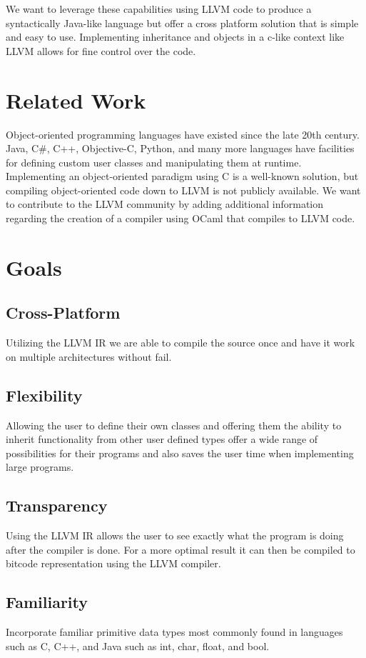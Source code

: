 \begin{homeworkProblem}
	We want to leverage these capabilities using LLVM code to produce a syntactically Java-like language but offer a cross platform solution that is simple and easy to use. Implementing inheritance and objects in a c-like context like LLVM allows for fine control over the code. \\
	
	\section{Related Work}
	Object-oriented programming languages have existed since the late 20th century. Java, C\#, C++, Objective-C, Python, and many more languages have facilities for defining custom user classes and manipulating them at runtime. \\
	
	Implementing an object-oriented paradigm using C is a well-known solution, but compiling object-oriented code down to LLVM is not publicly available. We want to contribute to the LLVM community by adding additional information regarding the creation of a compiler using OCaml that compiles to LLVM code. 
	
	\section{Goals}
	\subsection{Cross-Platform}
	Utilizing the LLVM IR we are able to compile the source once and have it work on multiple architectures without fail.\\
	\subsection{Flexibility}
	Allowing the user to define their own classes and offering them the ability to inherit functionality from other user defined types offer a wide range of possibilities for their programs and also saves the user time when implementing large programs.\\
	\subsection{Transparency}
	Using the LLVM IR allows the user to see exactly what the program is doing after the compiler is done. For a more optimal result it can then be compiled to bitcode representation using the LLVM compiler. \\
	\subsection{Familiarity}
	Incorporate familiar primitive data types most commonly found in languages such as C, C++, and Java such as int, char, float, and bool. 
\end{homeworkProblem}